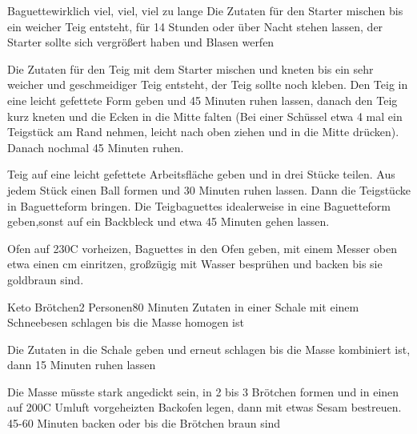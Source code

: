 

\begin{recipe}{Baguette}{}{wirklich viel, viel, viel zu lange}
Die Zutaten für den Starter mischen bis ein weicher Teig entsteht, für 14 Stunden oder über Nacht stehen lassen, der Starter sollte sich vergrößert haben und Blasen werfen

Die Zutaten für den Teig mit dem Starter mischen und kneten bis ein sehr weicher und geschmeidiger Teig entsteht, der Teig sollte noch kleben.
Den Teig in eine leicht gefettete Form geben und 45 Minuten ruhen lassen, danach den Teig kurz kneten und die Ecken in die Mitte falten (Bei einer Schüssel etwa 4 mal ein Teigstück am Rand nehmen, leicht nach oben ziehen und in die Mitte drücken). Danach nochmal 45 Minuten ruhen.

\ing[]{}{}
Teig auf eine leicht gefettete Arbeitsfläche geben und in drei Stücke teilen. Aus jedem Stück einen Ball formen und 30 Minuten ruhen lassen. Dann die Teigstücke in Baguetteform bringen.
Die Teigbaguettes idealerweise in eine Baguetteform geben,sonst auf ein Backbleck und etwa 45 Minuten gehen lassen. 

\ing[]{}{}
Ofen auf 230\0C vorheizen, Baguettes in den Ofen geben, mit einem Messer oben etwa einen cm einritzen, großzügig mit Wasser besprühen und backen bis sie goldbraun sind.
\end{recipe}


\begin{recipe}{Keto Brötchen}{2 Personen}{80 Minuten}
Zutaten in einer Schale mit einem Schneebesen schlagen bis die Masse homogen ist

Die Zutaten in die Schale geben und erneut schlagen bis die Masse kombiniert ist, dann 15 Minuten ruhen lassen

Die Masse müsste stark angedickt sein, in 2 bis 3 Brötchen formen und in einen auf 200\0C Umluft vorgeheizten Backofen legen, dann mit etwas Sesam bestreuen. 45-60 Minuten backen oder bis die Brötchen braun sind
\end{recipe} 

